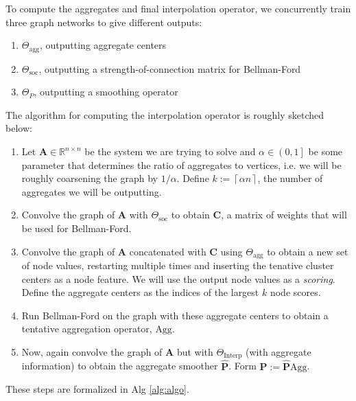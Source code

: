 \documentclass{article}
\newcommand{\mat}[1]{\bm{{#1}}}
\newcommand{\ceil}[1]{\left\lceil #1 \right\rceil}
\begin{document}
To compute the aggregates and final interpolation operator, we concurrently train three graph networks to give different outputs:
\begin{enumerate}
\item $\Theta_{\text{agg}}$, outputting aggregate centers
\item $\Theta_{\text{soc}}$, outputting a strength-of-connection matrix for Bellman-Ford
\item $\Theta_{P}$, outputting a smoothing operator
\end{enumerate}
The algorithm for computing the interpolation operator is roughly sketched below:
\begin{enumerate}
\item Let $\mat{A} \in \mathbb{R}^{n \times n}$ be the system we are trying to solve and $\alpha \in \left(0, 1\right]$ be some parameter that determines the ratio of aggregates to vertices, i.e. we will be roughly coarsening the graph by $1/\alpha$.  Define $k := \ceil{\alpha n}$, the number of aggregates we will be outputting.
\item Convolve the graph of $\mat{A}$ with $\Theta_{\text{soc}}$ to obtain $\mat{C}$, a matrix of weights that will be used for Bellman-Ford.
\item Convolve the graph of $\mat{A}$ concatenated with $\mat{C}$ using $\Theta_{\text{agg}}$ to obtain a new set of node values, restarting multiple times and inserting the tenative cluster centers as a node feature.  We will use the output node values as a \textit{scoring}.  Define the aggregate centers as the indices of the largest $k$ node scores.
\item Run Bellman-Ford on the graph with these aggregate centers to obtain a tentative aggregation operator, $\text{Agg}$.
\item Now, again convolve the graph of $\mat{A}$ but with $\Theta_{\text{Interp}}$ (with aggregate information) to obtain the aggregate smoother $\mat{\hat{P}}$.  Form $\mat{P} := \mat{\hat{P}}\text{Agg}$.
\end{enumerate}
These steps are formalized in Alg \ref{alg:algo}.
\end{document}
